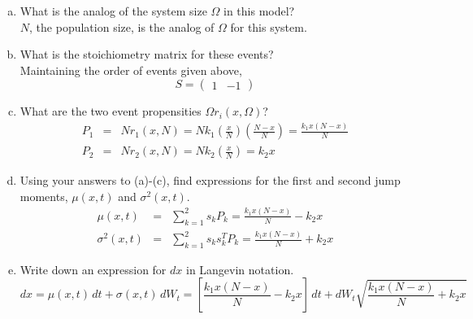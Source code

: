 \documentclass{article}
\begin{document}
\begin{enumerate}[a)]
\item What is the analog of the system size $\Omega$ in this model?\\
{\color{red}
$N$, the population size, is the analog of $\Omega$ for this system.
}

\item What is the stoichiometry matrix for these events?\\
{\color{red}
Maintaining the order of events given above,
\[ S = \begin{pmatrix} 1 & -1 \end{pmatrix} \]
}

\item What are the two event propensities $\Omega r_i(x, \Omega)$?
{\color{red}
\begin{eqnarray*} P_1 & = & N r_1(x,N) = N k_1 \left( \frac{x}{N} \right)\left( \frac{N - x}{N} \right) = \frac{k_1 x(N-x)}{N}\\
P_2 & = & N r_2(x,N) = N k_2 \left( \frac{x}{N} \right) = k_2 x
\end{eqnarray*}
}


\item Using your answers to (a)-(c), find expressions for the first and second jump moments, $\mu(x,t)$ and $\sigma^2(x,t)$.
{\color{red}
\begin{eqnarray*} \mu(x,t) & = & \sum_{k=1}^2 s_k P_k = \frac{k_1 x(N-x)}{N} - k_2 x\\
\sigma^2(x,t) & = & \sum_{k=1}^2 s_k s_k^T P_k = \frac{k_1 x(N-x)}{N} + k_2 x
\end{eqnarray*}
}

\item Write down an expression for $dx$ in Langevin notation.
{\color{red}
\[ dx = \mu(x,t) \, dt + \sigma(x,t) \, dW_t = \left[ \frac{k_1 x(N-x)}{N} - k_2 x \right] \, dt + dW_t \sqrt{\frac{k_1 x(N-x)}{N} + k_2 x} \]
}


\end{enumerate}
\end{document}
